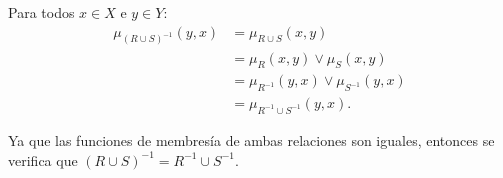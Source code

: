 
Para todos \(x ∈ X\) e \(y ∈ Y\):
\begin{align*}
     μ_{(R ∪ S)^{-1}}(y, x)
  &= μ_{ R ∪ S}(x, y) \\
  &= μ_R(x, y) ∨ μ_S(x, y) \\
  &= μ_{R^{-1}}(y, x) ∨ μ_{S^{-1}}(y, x) \\
  &= μ_{R^{-1} ∪ S^{-1}}(y, x).
\end{align*}

Ya que las funciones de membresía de ambas relaciones son iguales,
entonces se verifica que \((R ∪ S)^{-1} = R^{-1} ∪ S^{-1}\).

